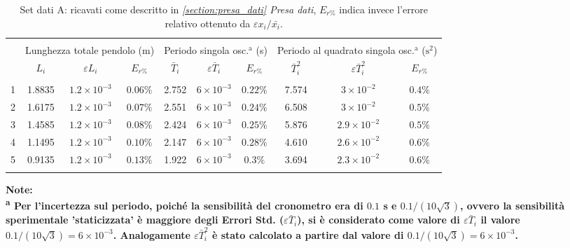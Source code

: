 \documentclass[italian, a4paper, 10pt, twocolumn]{../../style/lab_unige}
\begin{document}
  \begin{table}[t!]
    \footnotesize
    \centering
    \caption{Set dati A: ricavati come descritto in \textit{\ref{section:presa_dati} Presa dati}, $E_{r\%}$ 
    indica invece l'errore relativo ottenuto da $\varepsilon x_{i}/\bar{x_{i}}$.}
    \label{tab:A}
    \setlength{\tabcolsep}{1.93\tabcolsep}
    \begin{tabular}{lccccccccc}
      \hline\hline\\[-1.5ex]
        & \multicolumn{3}{c}{Lunghezza totale pendolo (m)} & \multicolumn{3}{c}{Periodo singola osc.$^{\text{a}}$ (s)}  & \multicolumn{3}{c}{Periodo al quadrato singola osc.$^{\text{a}}$ ($\text{s}^{2}$)} \\[+0.5ex] 
        & $L_{i}$ & $\varepsilon L_{i}$ & $E_{r\%}$        & $\bar{T}_{i}$  & $\varepsilon\bar{T}_{i}$                  & $E_{r\%}$ & $\bar{T}_{i}^{2}$ & $\varepsilon\bar{T}_{i}^{2}$ & $E_{r\%}$     \\[+0.5ex] \hline \\[-1.5ex]
      1 & 1.8835  & $1.2\times10^{-3}$  & $0.06\%$         & 2.752          & $6\times10^{-3}$                          & $0.22\%$  & 7.574             & $3 \times10^{-2}$            & $0.4\%$      \\[+0.5ex]
      2 & 1.6175  & $1.2\times10^{-3}$  & $0.07\%$         & 2.551          & $6\times10^{-3}$                          & $0.24\%$  & 6.508             & $3 \times10^{-2}$            & $0.5\%$      \\[+0.5ex]
      3 & 1.4585  & $1.2\times10^{-3}$  & $0.08\%$         & 2.424          & $6\times10^{-3}$                          & $0.25\%$  & 5.876             & $2.9 \times10^{-2}$          & $0.5\%$      \\[+0.5ex]
      4 & 1.1495  & $1.2\times10^{-3}$  & $0.10\%$         & 2.147          & $6\times10^{-3}$                          & $0.28\%$  & 4.610             & $2.6 \times10^{-2}$          & $0.6\%$      \\[+0.5ex]
      5 & 0.9135  & $1.2\times10^{-3}$  & $0.13\%$         & 1.922          & $6\times10^{-3}$                          & $0.3\%$   & 3.694             & $2.3 \times10^{-2}$          & $0.6\%$      \\[+0.5ex] 
      \hline \\[-1.5ex]
    \end{tabular}
    \raggedright
    \bfseries Note:\\
    \normalfont
    \textsuperscript{a} Per l'incertezza sul periodo, poiché la sensibilità del cronometro era di $0.1$ s e 
    $0.1/(10\sqrt{3})$, ovvero la sensibilità sperimentale 'staticizzata' è maggiore degli Errori Std. 
    ($\varepsilon \bar{T}_{i}$), si è considerato come valore di $\varepsilon \bar{T}_{i}$ il valore 
    $0.1/(10\sqrt{3})=6\times10^{-3}$. Analogamente $\varepsilon \bar{T}_{i}^{2}$ è stato calcolato a partire 
    dal valore di $0.1/(10\sqrt{3})=6\times10^{-3}$.
  \end{table}
\end{document}
